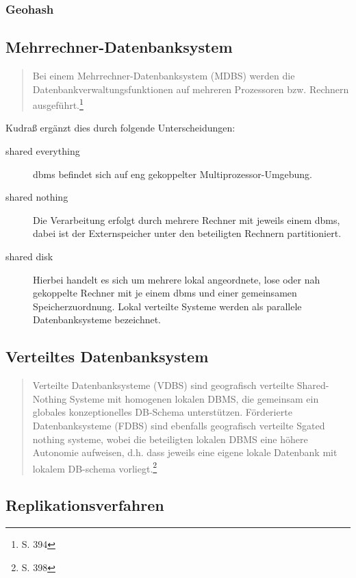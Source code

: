 \subsubsection{Geohash}

\subsection{Mehrrechner-Datenbanksystem}

\begin{quote}
Bei einem Mehrrechner-Datenbanksystem (MDBS) werden die Datenbankverwaltungsfunktionen auf mehreren Prozessoren bzw. Rechnern ausgeführt.\footnote{\cite{book:kudrass} S. 394}
\end{quote}
Kudraß ergänzt dies durch folgende Unterscheidungen:
\begin{description}
\item[shared everything] \Gls{dbms} befindet sich auf eng gekoppelter Multiprozessor-Umgebung.
\item[shared nothing] Die Verarbeitung erfolgt durch mehrere Rechner mit jeweils einem \Gls{dbms}, dabei ist der Externspeicher unter den beteiligten Rechnern partitioniert.
\item[shared disk] Hierbei handelt es sich um mehrere lokal angeordnete, lose oder nah gekoppelte Rechner mit je einem \Gls{dbms} und einer gemeinsamen Speicherzuordnung. Lokal verteilte Systeme werden als parallele Datenbanksysteme bezeichnet.
\end{description}

\subsection{Verteiltes Datenbanksystem}

\begin{quote}
Verteilte Datenbanksysteme (VDBS) sind geografisch verteilte Shared-Nothing Systeme mit homogenen lokalen DBMS, die gemeinsam ein globales konzeptionelles DB-Schema unterstützen.
Förderierte Datenbanksysteme (FDBS) sind ebenfalls geografisch verteilte Sgated nothing systeme, wobei die beteiligten lokalen DBMS eine höhere Autonomie aufweisen, d.h. dass jeweils eine eigene lokale Datenbank mit lokalem DB-schema vorliegt.\footnote{\cite{book:kudrass} S. 398}
\end{quote}

\subsection{Replikationsverfahren}

